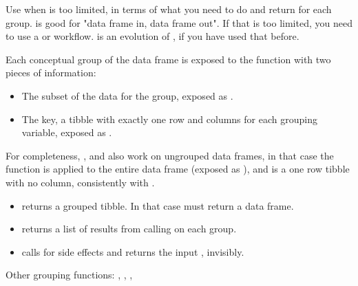 \documentclass[a4paper]{book}
\begin{document}
%
\begin{Details}
Use  when  is too limited, in terms of what you need
to do and return for each group.  is good for "data frame in, data frame out".
If that is too limited, you need to use a  or  workflow.
 is an evolution of , if you have used that before.

Each conceptual group of the data frame is exposed to the function  with two pieces of information:
\begin{itemize}

\item{} The subset of the data for the group, exposed as .
\item{} The key, a tibble with exactly one row and columns for each grouping variable, exposed as .

\end{itemize}


For completeness, ,  and  also work on
ungrouped data frames, in that case the function is applied to the
entire data frame (exposed as ), and  is a one row tibble with no
column, consistently with .
\end{Details}
%
\begin{Value}
\begin{itemize}

\item{}  returns a grouped tibble. In that case  must return a data frame.
\item{}  returns a list of results from calling  on each group.
\item{}  calls  for side effects and returns the input , invisibly.

\end{itemize}

\end{Value}
%
\begin{SeeAlso}
Other grouping functions: 
,
,
,
\end{SeeAlso}
%
\end{document}
